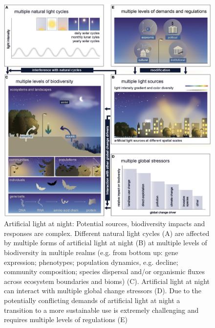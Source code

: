 \begin{figure}\centering
    \includegraphics[width=1\textwidth]{figures/fevo-09-767177-g002.jpg}
    \caption{Artificial light at night: Potential sources, biodiversity impacts and responses are complex. Different natural light cycles (A) are affected by multiple forms of artificial light at night (B) at multiple levels of biodiversity in multiple realms (e.g. from bottom up: gene expression; phenotypes; population dynamics, e.g. decline; community composition; species dispersal and/or organismic fluxes across ecosystem boundaries and bioms) (C). Artificial light at night can interact with multiple global change stressors (D). Due to the potentially conflicting demands of artificial light at night a transition to a more sustainable use is extremely challenging and requires multiple levels of regulations (E) \cite{10.3389/fevo.2021.767177}} \label{fig:figure2}
\end{figure}

